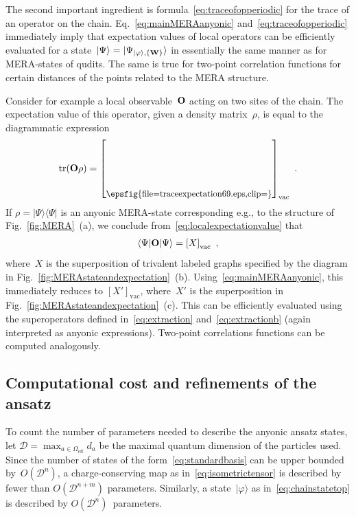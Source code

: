 \documentclass[floats,prb,twocolumn]{revtex4}
\newcommand*{\cD}{\mathscr{D}}
\newcommand*{\tr}{\mathop{\mathrm{tr}}\nolimits}
\newcommand{\ket}[1]{|#1\rangle}
\newcommand{\bra}[1]{\langle#1|}
\newcommand{\proj}[1]{|#1\rangle\langle#1|}
\newcommand*{\Xsingleoperator}{{\bf O}}
\newcommand*{\Xisometry}{{\bf W}}
\newcommand*{\traceexpectation}{\raisebox{-28.926pt}{\epsfig{file=traceexpectation69.eps,clip=}}}
\begin{document}
The second important ingredient is formula~\eqref{eq:traceofopperiodic} for the trace of an operator on the chain. Eq.~\eqref{eq:mainMERAanyonic} and~\eqref{eq:traceofopperiodic} immediately imply that  expectation values of local operators can be efficiently evaluated for a state~$\ket{\Psi}=\ket{\Psi_{\ket{\varphi},\{\Xisometry\}}}$ in essentially the same manner as for MERA-states of qudits. The same is true for two-point correlation functions for certain distances of the points related to the MERA structure.

Consider for example a local observable~$\Xsingleoperator$ acting on two sites of the chain.
The expectation value of this operator, given a  density matrix~$\rho$, is equal to the diagrammatic expression
\begin{align}
\tr(\Xsingleoperator \rho)=\left[\scalebox{0.9}{\traceexpectation}\right]_{\textrm{vac}}\ .\label{eq:localexpectationvalue}
\end{align}
If $\rho=\proj{\Psi}$ is an anyonic MERA-state corresponding e.g., to the structure of Fig.~\ref{fig:MERA}~(a), we conclude from~\eqref{eq:localexpectationvalue} that
\begin{align*}
\bra{\Psi}\Xsingleoperator\ket{\Psi}=\left[X\right]_{\textrm{vac}}\ ,
\end{align*}
where~$X$ is the superposition of trivalent labeled graphs specified by the diagram in Fig.~\ref{fig:MERAstateandexpectation}~(b). Using~\eqref{eq:mainMERAanyonic}, this immediately reduces to $\left[X'\right]_{\textrm{vac}}$, where~$X'$ is the superposition in Fig.~\ref{fig:MERAstateandexpectation}~(c). This can be efficiently evaluated using the superoperators defined in~\eqref{eq:extraction} and~\eqref{eq:extractionb} (again interpreted as anyonic expressions). Two-point correlations functions can be computed analogously.


\subsection{Computational cost and refinements of the ansatz}
 To count the number of parameters needed to describe the anyonic ansatz states, let $\cD=\max_{a\in\Omega_{\textrm{eff}}} d_a$ be the maximal quantum dimension of the particles used. Since the number of states of the form~\eqref{eq:standardbasis} can be upper bounded by~$O(\cD^n)$, a charge-conserving map as in~\eqref{eq:isometrictensor} is described by fewer than $O(\cD^{n+m})$ parameters. Similarly, a state~$\ket{\varphi}$ as in~\eqref{eq:chainstatetop} is described by $O(\cD^n)$~parameters.
 
\end{document}
